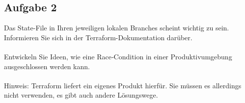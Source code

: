 \documentclass{article}
\begin{document}
    \subsection{Aufgabe 2}
    Das State-File in Ihren jeweiligen lokalen Branches scheint wichtig zu sein. Informieren Sie sich in der Terraform-Dokumentation darüber. \\ \\
    Entwickeln Sie Ideen, wie eine Race‑Condition in einer Produktivumgebung ausgeschlossen werden kann. \\ \\
    Hinweis: Terraform liefert ein eigenes Produkt hierfür. Sie müssen es allerdings nicht verwenden, es gibt auch andere Lösungswege.

    
\end{document}
